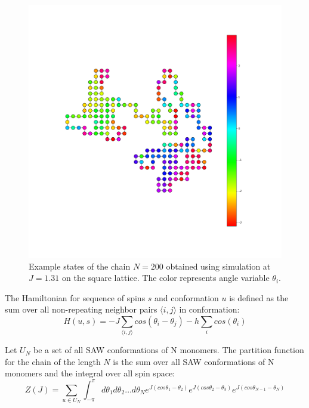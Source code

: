 \begin{figure}[H]
	\includegraphics[scale=0.2]{Images/state_example1.png}
	\caption{ Example states of the  chain $N=200$ obtained using simulation at $J=1.31$ on the square lattice. The color represents angle variable $\theta_i$. }
	\label{fig:example}
\end{figure}


 The Hamiltonian for sequence of spins $s$ and conformation $u$ is defined as the sum over all  non-repeating neighbor  pairs $\langle i, j \rangle$ in conformation:
\begin{equation}
\label{hamiltonian}
H(u,s) = -J \sum_{ \langle i, j \rangle } cos(\theta_i - \theta_j) - h \sum_i cos(\theta_i)
\end{equation}

Let $U_N$ be a set of all SAW conformations of N monomers. The partition function for the chain of the length $N$ is the sum over all SAW conformations of N monomers and the integral over all spin space:  
\begin{equation}
\label{partitionfunction}
Z(J) =  \sum_{u \in U_N }  \int_{-\pi}^{\pi} d \theta_1 d \theta_2 \dots d\theta_N
 e ^{J(cos\theta_1-\theta_2)} e ^{J(cos\theta_2-\theta_3)} 
 e ^{J(cos\theta_{N-1}-\theta_N)} %
\end{equation}

